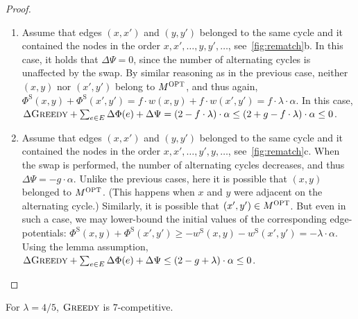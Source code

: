 \documentclass{siamart190516}
\newcommand{\GREEDY}{\textsc{Greedy}\xspace}
\newcommand{\MOPT}{M^\textsc{OPT}}
\newcommand{\Phiinit}{\Phi^\textrm{S}}
\newcommand{\winit}{w^\textrm{S}}
\begin{document}
\begin{proof}
\begin{enumerate}
\item
Assume that edges $(x,x')$ and $(y,y')$ belonged to the same cycle and
it contained the nodes in the order $x,x',\ldots,y,y',\ldots$,
see~\cref{fig:rematch}b. In this case, it holds that 
$\Delta \Psi = 0$, since 
the number of alternating cycles is unaffected by the swap. By similar
reasoning as in the previous case, neither $(x,y)$ nor $(x',y')$ belong to
$\MOPT$, and thus again, $\Phiinit(x,y) + \Phiinit(x',y') = f \cdot w(x,y) + f
\cdot w(x',y') = f \cdot \lambda \cdot \alpha$. In this case, $\Delta \GREEDY
+ \sum_{e \in E} \Delta \Phi(e) + \Delta\Psi = (2 - f \cdot \lambda) \cdot
\alpha \leq (2 + g - f \cdot \lambda) \cdot \alpha \leq 0$.

\item 
Assume that edges $(x,x')$ and $(y,y')$ belonged to the same cycle and
it contained the nodes in the order $x,x',\ldots,y',y,\ldots$,
see~\cref{fig:rematch}c. When the swap is performed, the number of
alternating cycles decreases, and thus $\Delta \Psi = -g \cdot \alpha$. Unlike
the previous cases, here it is possible that $(x,y)$ belonged to $\MOPT$.
(This happens when $x$ and $y$ were adjacent on the alternating cycle.)
Similarly, it is possible that $(x',y') \in \MOPT$. 
But even in such a case, we may lower-bound the initial values of the
corresponding edge-potentials: $\Phiinit(x,y) + \Phiinit(x',y') \geq -
\winit(x,y) - \winit(x',y') = - \lambda \cdot \alpha$. Using the lemma
assumption, $\Delta \GREEDY + \sum_{e \in E} \Delta \Phi(e) + \Delta\Psi 
\leq (2 - g + \lambda) \cdot \alpha \leq 0$.
\end{enumerate}

\end{proof}




\begin{theorem}
\label{thm:rematching}
For $\lambda = 4/5$, $\GREEDY$ is $7$-competitive.
\end{theorem}
\end{document}
